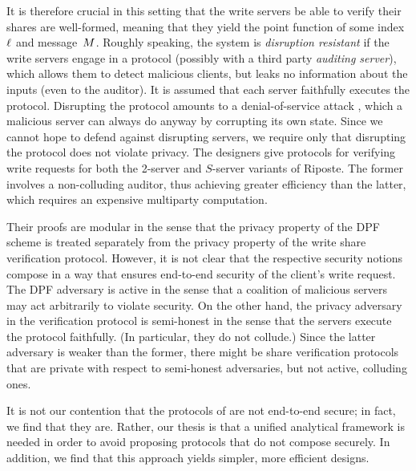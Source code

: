 It is therefore crucial in this setting that the write servers be able to verify
their shares are well-formed, meaning that they yield the point function of some
index~$\ell$ and message~$M$. Roughly speaking, the system is
\emph{disruption resistant} \cite{riposte} if the write servers engage in a
protocol (possibly with a third party \emph{auditing server}), which allows them
to detect malicious clients, but leaks no information about the inputs (even to
the auditor). It is assumed that each server faithfully executes the protocol.
Disrupting the protocol amounts to a denial-of-service attack \cite{riposte},
which a malicious server can always do anyway by corrupting its own state.
Since we cannot hope to defend against disrupting servers, we require only that
disrupting the protocol does not violate privacy.
The designers give protocols for verifying write requests for both the 2-server
and $S$-server variants of Riposte. The former involves a non-colluding
auditor, thus achieving greater efficiency than the latter, which requires an
expensive multiparty computation.

Their proofs are modular in the sense that the privacy property of the DPF
scheme is treated separately from the privacy property of the write share
verification protocol. However, it is not clear that the respective security
notions compose in a way that ensures end-to-end security of the client's write
request. The DPF adversary is active in the sense that a coalition of
malicious servers may act arbitrarily to violate security. On the other hand,
the privacy adversary in the verification protocol is semi-honest in the sense
that the servers execute the protocol faithfully. (In particular, they do not
collude.) Since the latter adversary is weaker than the former, there might be
share verification protocols that are private with respect to semi-honest
adversaries, but not active, colluding ones.

It is not our contention that the protocols of \cite{riposte} are not end-to-end
secure; in fact, we find that they are. Rather, our thesis is that a unified
analytical framework is needed in order to avoid proposing protocols that do not
compose securely. In addition, we find that this approach yields simpler, more
efficient designs.
\fi

%

